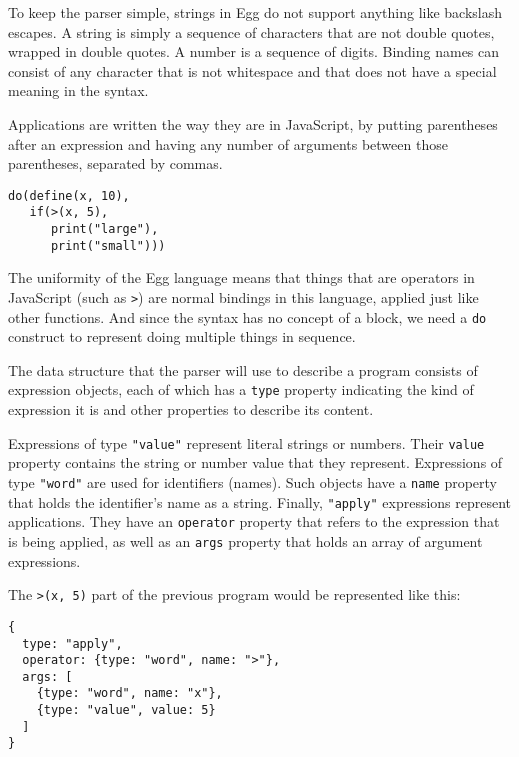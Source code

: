 To keep the parser simple, strings in Egg do not support anything like backslash escapes. A string is simply a sequence of characters that are not double quotes, wrapped in double quotes. A number is a sequence of digits. Binding names can consist of any character that is not whitespace and that does not have a special meaning in the syntax.

Applications are written the way they are in JavaScript, by putting parentheses after an expression and having any number of arguments between those parentheses, separated by commas.

\begin{lstlisting}
do(define(x, 10),
   if(>(x, 5),
      print("large"),
      print("small")))
\end{lstlisting}
\noindent{}

The uniformity of the Egg language means that things that are operators in JavaScript (such as \lstinline`>`) are normal bindings in this language, applied just like other functions. And since the syntax has no concept of a block, we need a \lstinline`do` construct to represent doing multiple things in sequence.

The data structure that the parser will use to describe a program consists of expression objects, each of which has a \lstinline`type` property indicating the kind of expression it is and other properties to describe its content.

Expressions of type \lstinline`"value"` represent literal strings or numbers. Their \lstinline`value` property contains the string or number value that they represent. Expressions of type \lstinline`"word"` are used for identifiers (names). Such objects have a \lstinline`name` property that holds the identifier's name as a string. Finally, \lstinline`"apply"` expressions represent applications. They have an \lstinline`operator` property that refers to the expression that is being applied, as well as an \lstinline`args` property that holds an array of argument expressions.

The \lstinline`>(x, 5)` part of the previous program would be represented like this:

\begin{lstlisting}
{
  type: "apply",
  operator: {type: "word", name: ">"},
  args: [
    {type: "word", name: "x"},
    {type: "value", value: 5}
  ]
}
\end{lstlisting}
\noindent{}

